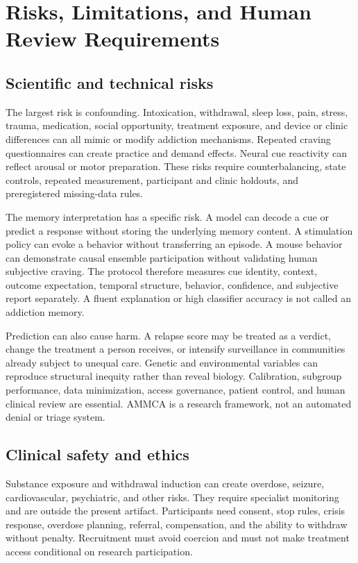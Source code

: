 \documentclass[conference]{IEEEtran}
\begin{document}
\section{Risks, Limitations, and Human Review Requirements}
\subsection{Scientific and technical risks}
The largest risk is confounding. Intoxication, withdrawal, sleep loss, pain, stress, trauma, medication, social opportunity, treatment exposure, and device or clinic differences can all mimic or modify addiction mechanisms. Repeated craving questionnaires can create practice and demand effects. Neural cue reactivity can reflect arousal or motor preparation. These risks require counterbalancing, state controls, repeated measurement, participant and clinic holdouts, and preregistered missing-data rules.

The memory interpretation has a specific risk. A model can decode a cue or predict a response without storing the underlying memory content. A stimulation policy can evoke a behavior without transferring an episode. A mouse behavior can demonstrate causal ensemble participation without validating human subjective craving. The protocol therefore measures cue identity, context, outcome expectation, temporal structure, behavior, confidence, and subjective report separately. A fluent explanation or high classifier accuracy is not called an addiction memory.

Prediction can also cause harm. A relapse score may be treated as a verdict, change the treatment a person receives, or intensify surveillance in communities already subject to unequal care. Genetic and environmental variables can reproduce structural inequity rather than reveal biology. Calibration, subgroup performance, data minimization, access governance, patient control, and human clinical review are essential. AMMCA is a research framework, not an automated denial or triage system.

\subsection{Clinical safety and ethics}
Substance exposure and withdrawal induction can create overdose, seizure, cardiovascular, psychiatric, and other risks. They require specialist monitoring and are outside the present artifact. Participants need consent, stop rules, crisis response, overdose planning, referral, compensation, and the ability to withdraw without penalty. Recruitment must avoid coercion and must not make treatment access conditional on research participation.
\end{document}
